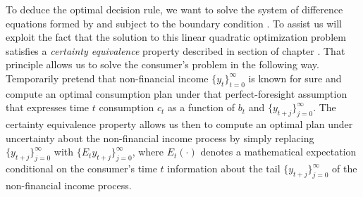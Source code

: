  To deduce the optimal decision rule, we want to solve the system
of difference equations formed by  and  
subject to the boundary condition . 
To assist us 
will exploit the fact that the solution to this linear quadratic
optimization problem satisfies a {\it certainty equivalence\/} property described in 
section  of  chapter . That principle allows us to solve the consumer's
problem in the following way.
%
 Temporarily  pretend that non-financial income $\{y_t\}_{t=0}^\infty$ is known for sure 
and compute an optimal consumption plan under that perfect-foresight assumption that expresses time $t$ consumption $c_t$ as a function of 
$b_t$ and $\{y_{t+j}\}_{j=0}^\infty$. The certainty equivalence property allows us then to  compute an optimal plan under uncertainty about the non-financial
income process by simply replacing  $\{y_{t+j}\}_{j=0}^\infty$ %
 with  $\{E_t y_{t+j}\}_{j=0}^\infty$, where $E_t(\cdot)$ denotes a mathematical 
expectation conditional on the consumer's time $t$ information about the tail $\{y_{t+j}\}_{j=0}^\infty$
of the non-financial income process.

